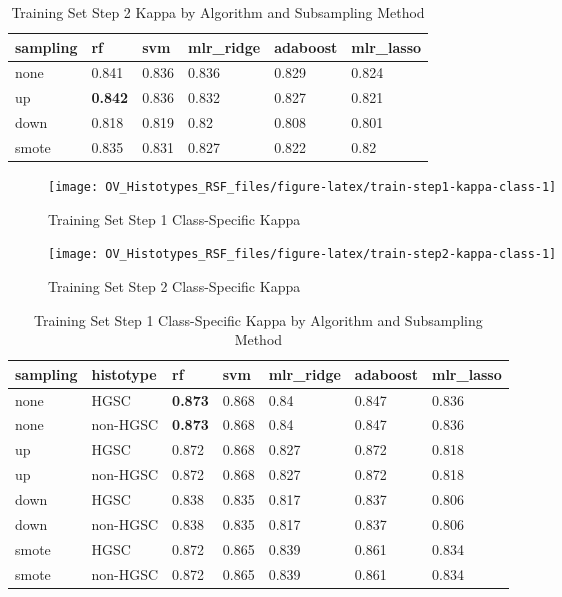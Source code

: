 \documentclass[
]{report}
\begin{document}
\begin{table}

\caption{\label{tab:train-step2-kappa-table}Training Set Step 2 Kappa by Algorithm and Subsampling Method}
\centering
\begin{tabular}[t]{l|l|l|l|l|l}
\hline
sampling & rf & svm & mlr\_ridge & adaboost & mlr\_lasso\\
\hline
none & 0.841 & 0.836 & 0.836 & 0.829 & 0.824\\
\hline
up & \textbf{0.842} & 0.836 & 0.832 & 0.827 & 0.821\\
\hline
down & 0.818 & 0.819 & 0.82 & 0.808 & 0.801\\
\hline
smote & 0.835 & 0.831 & 0.827 & 0.822 & 0.82\\
\hline
\end{tabular}
\end{table}

\begin{figure}[H]

{\centering \texttt{[image: OV\_Histotypes\_RSF\_files/figure-latex/train-step1-kappa-class-1]} 

}

\caption{Training Set Step 1 Class-Specific Kappa}\label{fig:train-step1-kappa-class}
\end{figure}

\begin{figure}[H]

{\centering \texttt{[image: OV\_Histotypes\_RSF\_files/figure-latex/train-step2-kappa-class-1]} 

}

\caption{Training Set Step 2 Class-Specific Kappa}\label{fig:train-step2-kappa-class}
\end{figure}

\begin{table}

\caption{\label{tab:train-step1-kappa-class-table}Training Set Step 1 Class-Specific Kappa by Algorithm and Subsampling Method}
\centering
\begin{tabular}[t]{l|l|l|l|l|l|l}
\hline
sampling & histotype & rf & svm & mlr\_ridge & adaboost & mlr\_lasso\\
\hline
none & HGSC & \textbf{0.873} & 0.868 & 0.84 & 0.847 & 0.836\\
\hline
none & non-HGSC & \textbf{0.873} & 0.868 & 0.84 & 0.847 & 0.836\\
\hline
up & HGSC & 0.872 & 0.868 & 0.827 & 0.872 & 0.818\\
\hline
up & non-HGSC & 0.872 & 0.868 & 0.827 & 0.872 & 0.818\\
\hline
down & HGSC & 0.838 & 0.835 & 0.817 & 0.837 & 0.806\\
\hline
down & non-HGSC & 0.838 & 0.835 & 0.817 & 0.837 & 0.806\\
\hline
smote & HGSC & 0.872 & 0.865 & 0.839 & 0.861 & 0.834\\
\hline
smote & non-HGSC & 0.872 & 0.865 & 0.839 & 0.861 & 0.834\\
\hline
\end{tabular}
\end{table}
\end{document}
